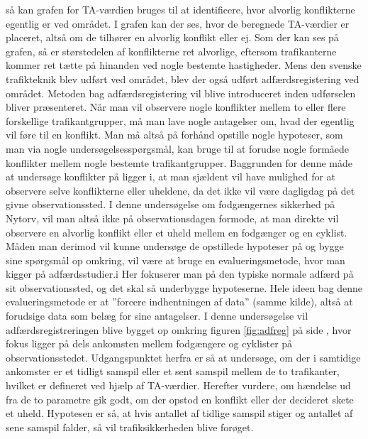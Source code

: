 så kan grafen for TA-værdien bruges til at identificere, hvor alvorlig konflikterne egentlig er ved området. I grafen kan der ses, hvor de beregnede TA-værdier er placeret, altså om de tilhører en alvorlig konflikt eller ej.
Som der kan ses på grafen, så er størstedelen af konflikterne ret alvorlige, eftersom trafikanterne kommer ret tætte på hinanden ved nogle bestemte hastigheder.
Mens den svenske trafikteknik blev udført ved området, blev der også udført adfærdsregistering ved området. Metoden bag adfærdsregistering vil blive introduceret inden udførselen bliver præsenteret.
Når	man	vil	observere nogle	konflikter mellem to eller flere	forskellige trafikantgrupper,	må man lave	nogle antagelser	om, hvad	 der egentlig vil føre til en konflikt. Man må altså	på	forhånd	opstille nogle hypoteser, som man via nogle undersøgelsesspørgsmål, kan bruge til	at forudse nogle	formåede	konflikter mellem nogle bestemte	trafikantgrupper.	Baggrunden for denne	måde at	undersøge konflikter	på ligger i,	at man sjældent 	vil	have	mulighed	 for at	observere selve konflikterne	eller uheldene, da det ikke	vil	være	 dagligdag på	 det	 givne observationssted.	I denne	undersøgelse om	fodgængernes sikkerhed på	Nytorv,	vil man altså ikke på observationsdagen formode,	at man direkte vil observere en alvorlig konflikt eller	et uheld mellem	en fodgænger og	en cyklist.	Måden man derimod	vil	kunne undersøge	de opstillede hypoteser på og bygge sine	spørgsmål op omkring, vil	være	at bruge en	evalueringsmetode, hvor	man	kigger på adfærdsstudier.i Her fokuserer	man	på den typiske normale adfærd på	sit observationssted, og	det skal så	underbygge	hypoteserne. Hele ideen bag denne evalueringsmetode er at ”forcere indhentningen af data”	(samme	kilde),	altså at forudsige data	som	belæg for sine antagelser.
I denne undersøgelse vil	adfærdsregistreringen blive bygget op omkring	figuren \cref{fig:adfreg} på side \pageref{fig:adfreg},
hvor fokus ligger på dels ankomsten mellem fodgængere	 og cyklister på observationsstedet. Udgangspunktet herfra er så at	undersøge, om	der i samtidige ankomster er et tidligt samspil eller	et sent samspil mellem de to trafikanter, hvilket er defineret ved hjælp af TA-værdier.
Herefter vurdere, om hændelse ud fra	de to parametre gik godt, om	der	opstod en konflikt	eller der decideret skete et	uheld. Hypotesen er	så,	at hvis	antallet af	tidlige samspil stiger og antallet af sene samspil falder, så vil trafiksikkerheden blive forøget.
